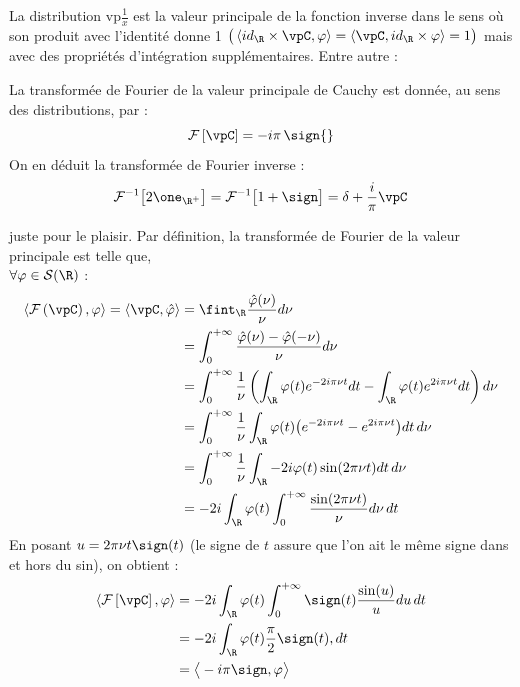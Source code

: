 La distribution vp$\frac{1}{x}$ est la valeur principale de la fonction inverse dans le sens où son produit avec l'identité donne 1 $\big(\left\langle id_\R \times \vpC, \varphi \right\rangle = \left\langle \vpC, id_\R \times\varphi \right\rangle=1\big)$ mais avec des propriétés d'intégration supplémentaires. Entre autre :


\begin{propriete}\label{prop:fou2vp}
	La transformée de Fourier de la valeur principale de Cauchy est donnée, au sens des distributions, par :
	\begin{equation}
		\mathcal{F} \left[\vpC \right]= -i \pi\, \sign{} 
	\end{equation}
	On en déduit la transformée de Fourier inverse :
	\begin{equation}
	\mathcal{F}^{-1}\big[ 2\one_{\R^+} \big] = \mathcal{F}^{-1}\big[ 1 + \sign \big] = \delta + \frac{i}{\pi} \vpC
	\end{equation}
\end{propriete}

	
\begin{demo}
	juste pour le plaisir. Par définition, la transformée de Fourier de la valeur principale est telle que,\\ $\forall \varphi\in\mathcal{S}(\R)$ :
	\begin{align*}
		\left\langle \mathcal{F} \left(\vpC \right), \varphi \right\rangle = \left\langle \vpC, \hat{\varphi} \right\rangle 
		&= \fint_\R \frac{\hat{\varphi}(\nu)}{\nu} d\nu \\
		&= \int_0^{+\infty} \frac{\hat{\varphi}(\nu) - \hat{\varphi}(-\nu)}{\nu} d\nu \\
		&= \int_0^{+\infty} \frac{1}{\nu} \left( \int_\R\varphi(t)e^{-2i\pi \nu t}dt - \int_\R\varphi(t)e^{2i\pi \nu t}dt \right)d\nu \\
		&= \int_0^{+\infty} \frac{1}{\nu}\int_\R\varphi(t)\big(e^{-2i\pi \nu t} - e^{2i\pi \nu t}\big)dt\, d\nu \\
		&= \int_0^{+\infty} \frac{1}{\nu}\int_\R-2i\varphi(t)\sin(2\pi \nu t)dt\, d\nu \\
		&= -2i\int_\R\varphi(t)\int_0^{+\infty} \frac{\sin(2\pi \nu t)}{\nu}d\nu\, dt
	\end{align*}
	En posant $u=2\pi\nu t\sign(t)$ (le signe de $t$ assure que l'on ait le même signe dans et hors du sin), on obtient :
	\begin{align*}
		\left\langle \mathcal{F} \left[\vpC \right], \varphi \right\rangle &= -2i\int_\R\varphi(t)\int_0^{+\infty} \sign(t)\frac{\sin(u)}{u}du\, dt \\
		&= -2i\int_\R\varphi(t)\frac{\pi}{2}\sign(t), dt \\
		&= \big\langle -i\pi\sign, \varphi \big\rangle
	\end{align*}
\end{demo}

